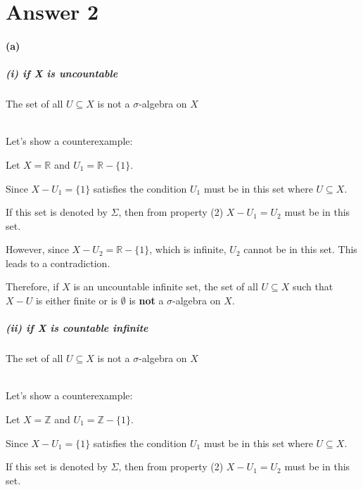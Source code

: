 \documentclass[12pt]{article}
\begin{document}
\section*{Answer 2}
\paragraph{(a)}
\subparagraph{(i) if X is uncountable} 
The set of all \( U \subseteq X \) is not a \(\sigma\)-algebra on \(X\) \\ \\
\par \hspace*{1em}Let's show a counterexample: \\
\par \hspace*{1em}Let \( X = \mathbb{R} \) and \( U_1 = \mathbb{R} - \{1\} \). \\
\par \hspace*{1em}Since \( X - U_1 = \{1\} \) satisfies the condition \( U_1 \) must be in this set where \( U \subseteq X \).\\
\par \hspace*{1em}If this set is denoted by \( \Sigma \), then from property (2) \( X - U_1 = U_2 \) must be in this set.\\

\par \hspace*{1em}However, since \( X - U_2 = \mathbb{R} - \{1\} \), which is infinite, \( U_2 \) cannot be in this set. This leads to a contradiction.\\

\par \hspace*{1em}Therefore, if \( X \) is an uncountable infinite set, the set of all \( U \subseteq X \) such that \( X - U \) is either finite or is \(\emptyset\) is \textbf{not}  a \( \sigma \)-algebra on \( X \).\\

\subparagraph{(ii) if X is countable infinite}
The set of all \( U \subseteq X \) is not a \(\sigma\)-algebra on \(X\) \\ \\
\par \hspace*{1em}Let's show a counterexample: \\
\par \hspace*{1em}Let \( X = \mathbb{Z} \) and \( U_1 = \mathbb{Z} - \{1\} \). \\
\par \hspace*{1em}Since \( X - U_1 = \{1\} \) satisfies the condition \( U_1 \) must be in this set where \( U \subseteq X \).\\
\par \hspace*{1em}If this set is denoted by \( \Sigma \), then from property (2) \( X - U_1 = U_2 \) must be in this set.\\
\end{document}

